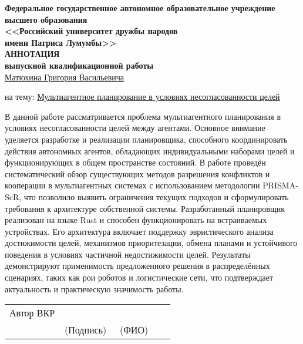 \begin{center}
  \textbf{Федеральное государственное автономное образовательное учреждение высшего образования} \\
  \textbf{<<Российский университет дружбы народов}\\
  \textbf{имени Патриса Лумумбы>>}\\

  \large \textbf{АННОТАЦИЯ}\\
  \normalsize \textbf{выпускной квалификационной работы} \\

  \underline{Матюхина Григория Васильевича}
\end{center}

на тему: \uline{Мультиагентное планирование в условиях несогласованности целей}

В данной работе рассматривается проблема мультиагентного планирования
в условиях несогласованности целей между агентами.
Основное внимание уделяется разработке и реализации планировщика,
способного координировать действия автономных агентов,
обладающих индивидуальными наборами целей
и функционирующих в общем пространстве состояний.
В работе проведён систематический обзор
существующих методов разрешения конфликтов и кооперации
в мультиагентных системах с использованием методологии PRISMA-ScR,
что позволило выявить ограничения текущих подходов
и сформулировать требования к архитектуре собственной системы.
Разработанный планировщик реализован на языке Rust
и способен функционировать на встраиваемых устройствах.
Его архитектура включает поддержку эвристического анализа достижимости целей,
механизмов приоритезации, обмена планами и устойчивого поведения
в условиях частичной недостижимости целей.
Результаты демонстрируют применимость предложенного решения в распределённых сценариях,
таких как рои роботов и логистические сети,
что подтверждает актуальность и практическую значимость работы.

\vspace*{\fill}

\noindent \begin{tabular}{p{0.33\linewidth} p{0.33\linewidth} p{0.33\linewidth}}
Автор ВКР & \underline{\phantom{signature sign}} & \underline{\phantom{Матюхин Григорий}} \\
& (Подпись) & (ФИО)
\end{tabular}

\thispagestyle{empty} 
